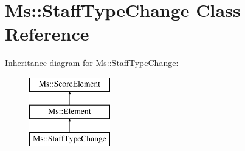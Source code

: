 \hypertarget{class_ms_1_1_staff_type_change}{}\section{Ms\+:\+:Staff\+Type\+Change Class Reference}
\label{class_ms_1_1_staff_type_change}
Inheritance diagram for Ms\+:\+:Staff\+Type\+Change\+:\begin{figure}[H]
\begin{center}
\leavevmode
\includegraphics[height=3.000000cm]{class_ms_1_1_staff_type_change}
\end{center}
\end{figure}
